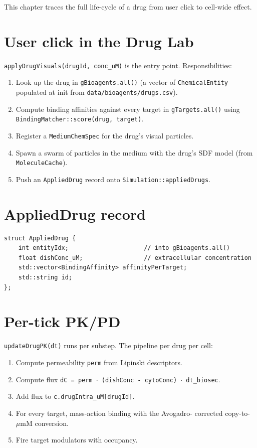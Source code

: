 \documentclass[11pt,letterpaper,twoside,openany]{book}
\newcommand{\code}[1]{\texttt{#1}}
\newcommand{\file}[1]{\texttt{\small#1}}
\newcommand{\um}{\ensuremath{\mu\text{m}}}
\begin{document}
This chapter traces the full life-cycle of a drug from user click
to cell-wide effect.

\section{User click in the Drug Lab}

\code{applyDrugVisuals(drugId, conc\_uM)} is the entry point.
Responsibilities:
\begin{enumerate}
  \item Look up the drug in \code{gBioagents.all()}
        (a vector of \code{ChemicalEntity} populated at init from
        \file{data/bioagents/drugs.csv}).
  \item Compute binding affinities against every target in
        \code{gTargets.all()} using
        \code{BindingMatcher::score(drug, target)}.
  \item Register a \code{MediumChemSpec} for the drug's visual
        particles.
  \item Spawn a swarm of particles in the medium with the drug's
        SDF model (from \code{MoleculeCache}).
  \item Push an \code{AppliedDrug} record onto
        \code{Simulation::appliedDrugs}.
\end{enumerate}

\section{AppliedDrug record}

\begin{lstlisting}
struct AppliedDrug {
    int entityIdx;                     // into gBioagents.all()
    float dishConc_uM;                 // extracellular concentration
    std::vector<BindingAffinity> affinityPerTarget;
    std::string id;
};
\end{lstlisting}

\section{Per-tick PK/PD}

\code{updateDrugPK(dt)} runs per substep. The pipeline per drug per
cell:
\begin{enumerate}
  \item Compute permeability \code{perm} from Lipinski descriptors.
  \item Compute flux \code{dC = perm \(\cdot\) (dishConc - cytoConc)
        \(\cdot\) dt\_biosec}.
  \item Add flux to \code{c.drugIntra\_uM[drugId]}.
  \item For every target, mass-action binding with the Avogadro-
        corrected copy-to-\um M conversion.
  \item Fire target modulators with occupancy.
\end{enumerate}
\end{document}
